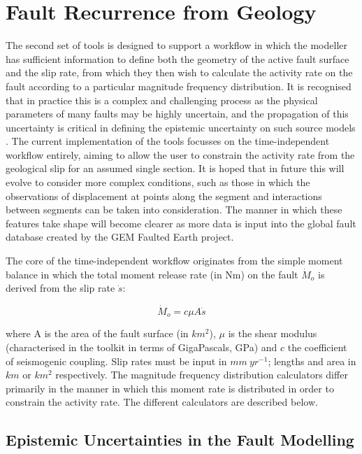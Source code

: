 \section{Fault Recurrence from Geology}

The second set of tools is designed to support a workflow in which the modeller has sufficient information to define both the geometry of the active fault surface and the slip rate, from which they then wish to calculate the activity rate on the fault according to a particular magnitude frequency distribution. It is recognised that in practice this is a complex and challenging process as the physical parameters of many faults may be highly uncertain, and the propagation of this uncertainty is critical in defining the epistemic uncertainty on such source models \citep{Peruzza_etal2010}. The current implementation of the tools focusses on the time-independent workflow entirely, aiming to allow the user to constrain the activity rate from the geological slip for an assumed single section. It is hoped that in future this will evolve to consider more complex conditions, such as those in which the observations of displacement at points along the segment and interactions between segments can be taken into consideration. The manner in which these features take shape will become clearer as more data is input into the global fault database created by the GEM Faulted Earth project.

The core of the time-independent workflow originates from the simple moment balance 
in which the total moment release rate (in Nm) on the fault $\dot{M}_o$ is derived from the slip rate $\dot{s}$\citep{AndersonLuco1983, Bungum2007}: 

\begin{equation}
\dot{M}_o = c \mu A \dot{s}
\end{equation}

where A is the area of the fault surface (in $km^2$), $\mu$ is the shear modulus (characterised in the toolkit in terms of GigaPascals, GPa) and $c$ the coefficient of seismogenic coupling. Slip rates must be input in $mm\ yr^{-1}$; lengths and area in $km$ or $km^2$ respectively. The magnitude frequency distribution calculators differ primarily in the manner in which this moment rate is distributed in order to constrain the activity rate. The different calculators are described below.

\subsection{Epistemic Uncertainties in the Fault Modelling}

